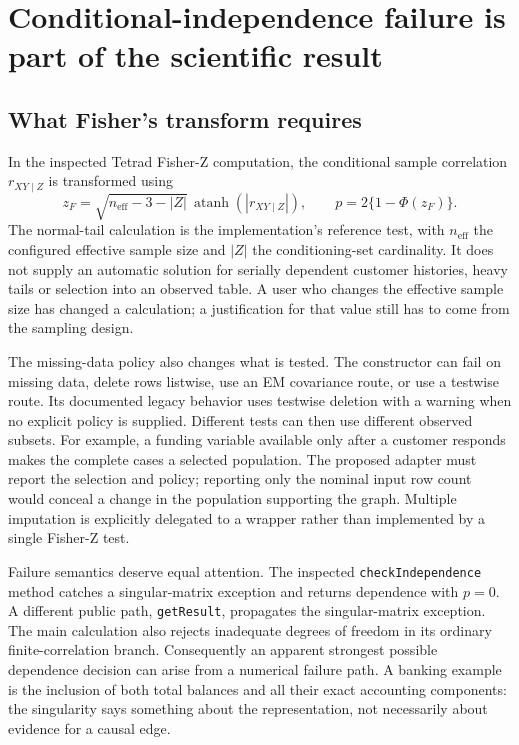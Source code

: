 \hypertarget{conditional-independence-failure-is-part-of-the-scientific-result}{%
\section{Conditional-independence failure is part of the scientific
result}\label{conditional-independence-failure-is-part-of-the-scientific-result}}

\hypertarget{what-fishers-transform-requires}{%
\subsection{What Fisher's transform
requires}\label{what-fishers-transform-requires}}

In the inspected Tetrad Fisher-Z computation, the conditional sample
correlation \(r_{XY\mid Z}\) is transformed using \[
 z_F=\sqrt{n_{\mathrm{eff}}-3-|Z|}\,
       \operatorname{atanh}(|r_{XY\mid Z}|),\qquad
 p=2\{1-\Phi(z_F)\}.
\] The normal-tail calculation is the implementation's reference test,
with \(n_{\mathrm{eff}}\) the configured effective sample size and
\(|Z|\) the conditioning-set cardinality. It does not supply an
automatic solution for serially dependent customer histories, heavy
tails or selection into an observed table. A user who changes the
effective sample size has changed a calculation; a justification for
that value still has to come from the sampling design.
\citep{exec13_java_tetrad}

The missing-data policy also changes what is tested. The constructor can
fail on missing data, delete rows listwise, use an EM covariance route,
or use a testwise route. Its documented legacy behavior uses testwise
deletion with a warning when no explicit policy is supplied. Different
tests can then use different observed subsets. For example, a funding
variable available only after a customer responds makes the complete
cases a selected population. The proposed adapter must report the
selection and policy; reporting only the nominal input row count would
conceal a change in the population supporting the graph. Multiple
imputation is explicitly delegated to a wrapper rather than implemented
by a single Fisher-Z test. \citep{exec13_java_tetrad}

Failure semantics deserve equal attention. The inspected
\texttt{checkIndependence} method catches a singular-matrix exception
and returns dependence with \(p=0\). A different public path,
\texttt{getResult}, propagates the singular-matrix exception. The main
calculation also rejects inadequate degrees of freedom in its ordinary
finite-correlation branch. Consequently an apparent strongest possible
dependence decision can arise from a numerical failure path. A banking
example is the inclusion of both total balances and all their exact
accounting components: the singularity says something about the
representation, not necessarily about evidence for a causal edge.
\citep{exec13_java_tetrad}

